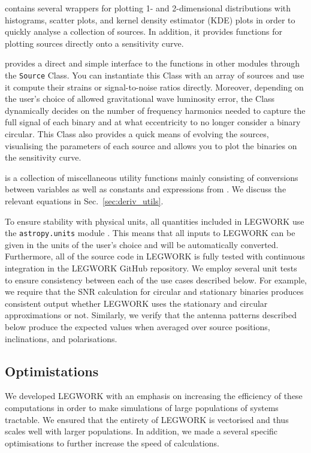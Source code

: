 \documentclass[twocolumn]{aastex631}
\newcommand{\lw}{LEGWORK}
\newcommand{\lwColour}{SeaGreen}
\newcommand{\lwModLink}[1]{\href{https://legwork.readthedocs.io/en/latest/modules.html\#module-legwork.#1}{\color{\lwColour}{\texttt{#1}}}}
\begin{document}
\lwModLink{visualisation} contains several wrappers for plotting 1- and 2-dimensional distributions with histograms, scatter plots, and kernel density estimator (KDE) plots in order to quickly analyse a collection of sources. In addition, it provides functions for plotting sources directly onto a sensitivity curve.

\lwModLink{source} provides a direct and simple interface to the functions in other modules through the \texttt{Source} Class. You can instantiate this Class with an array of sources and use it compute their strains or signal-to-noise ratios directly. Moreover, depending on the user's choice of allowed gravitational wave luminosity error, the Class dynamically decides on the number of frequency harmonics needed to capture the full signal of each binary and at what eccentricity to no longer consider a binary circular. This Class also provides a quick means of evolving the sources, visualising the parameters of each source and allows you to plot the binaries on the sensitivity curve.

\lwModLink{utils} is a collection of miscellaneous utility functions mainly consisting of conversions between variables as well as constants and expressions from \citet{Peters+1964}. We discuss the relevant equations in Sec.~\ref{sec:deriv_utils}.

To ensure stability with physical units, all quantities included in \lw{} use the \texttt{astropy.units} module \citep{AstropyCollaboration+2013, AstropyCollaboration+2018}. This means that all inputs to \lw{} can be given in the units of the user's choice and will be automatically converted. Furthermore, all of the source code in \lw{} is fully tested with continuous integration in the \lw{} GitHub repository. We employ several unit tests to ensure consistency between each of the use cases described below. For example, we require that the SNR calculation for circular and stationary binaries produces consistent output whether \lw{} uses the stationary and circular approximations or not. Similarly, we verify that the antenna patterns described below produce the expected values when averaged over source positions, inclinations, and polarisations.

\subsection{Optimistations}

We developed \lw{} with an emphasis on increasing the efficiency of these computations in order to make simulations of large populations of systems tractable. We ensured that the entirety of \lw{} is vectorised and thus scales well with larger populations. In addition, we made a several specific optimisations to further increase the speed of calculations.
\end{document}
